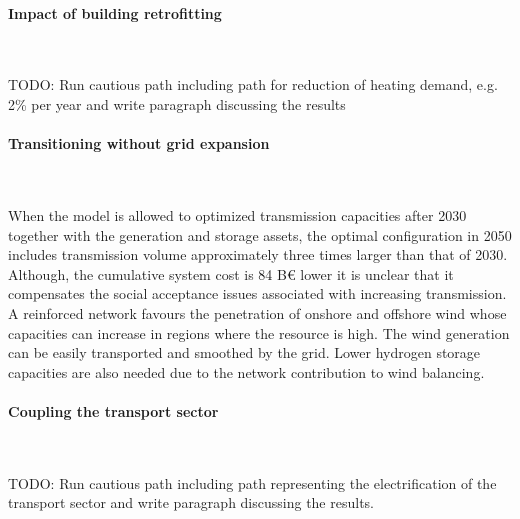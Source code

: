 \documentclass[5p]{elsarticle} %
\begin{document}
\paragraph{\textbf{Impact of building retrofitting}} \


\textcolor[rgb]{1,0,0}{TODO: Run cautious path including path for reduction of heating demand, e.g. 2\% per year and write paragraph discussing the results}


\paragraph{\textbf{Transitioning without grid expansion}} \

When the model is allowed to optimized transmission capacities after 2030 together with the generation and storage assets, the optimal configuration in 2050 includes transmission volume approximately three times larger than that of 2030.  Although, the cumulative system cost is 84 B€ lower it is unclear that it compensates the social acceptance issues associated with increasing transmission. A reinforced network favours the penetration of onshore and offshore wind whose capacities can increase in regions where the resource is high. The wind generation can be easily transported and smoothed by the grid. Lower hydrogen storage capacities are also needed due to the network contribution to wind balancing. 




\paragraph{\textbf{Coupling the transport sector}} \

\textcolor[rgb]{1,0,0}{TODO: Run cautious path including path representing the electrification of the transport sector and write paragraph discussing the results.}


\end{document}
